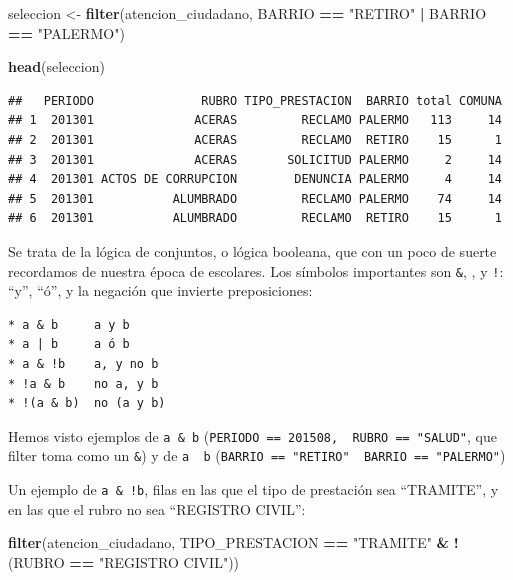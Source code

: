 \documentclass[]{book}
\newenvironment{Shaded}{\begin{snugshade}}{\end{snugshade}}
\newcommand{\KeywordTok}[1]{\textcolor[rgb]{0.13,0.29,0.53}{\textbf{#1}}}
\newcommand{\StringTok}[1]{\textcolor[rgb]{0.31,0.60,0.02}{#1}}
\newcommand{\OperatorTok}[1]{\textcolor[rgb]{0.81,0.36,0.00}{\textbf{#1}}}
\newcommand{\NormalTok}[1]{#1}
\begin{document}
\begin{Shaded}
\begin{Highlighting}[]
\NormalTok{seleccion <-}\StringTok{ }\KeywordTok{filter}\NormalTok{(atencion_ciudadano, BARRIO }\OperatorTok{==}\StringTok{ "RETIRO"} \OperatorTok{|}\StringTok{ }\NormalTok{BARRIO }\OperatorTok{==}\StringTok{ "PALERMO"}\NormalTok{)}

\KeywordTok{head}\NormalTok{(seleccion)}
\end{Highlighting}
\end{Shaded}

\begin{verbatim}
##   PERIODO               RUBRO TIPO_PRESTACION  BARRIO total COMUNA
## 1  201301              ACERAS         RECLAMO PALERMO   113     14
## 2  201301              ACERAS         RECLAMO  RETIRO    15      1
## 3  201301              ACERAS       SOLICITUD PALERMO     2     14
## 4  201301 ACTOS DE CORRUPCION        DENUNCIA PALERMO     4     14
## 5  201301           ALUMBRADO         RECLAMO PALERMO    74     14
## 6  201301           ALUMBRADO         RECLAMO  RETIRO    15      1
\end{verbatim}

Se trata de la lógica de conjuntos, o lógica booleana, que con un poco
de suerte recordamos de nuestra época de escolares. Los símbolos
importantes son \texttt{\&}, \texttt{\textbar{}}, y \texttt{!}: ``y'',
``ó'', y la negación que invierte preposiciones:

\begin{verbatim}
* a & b     a y b
* a | b     a ó b
* a & !b    a, y no b
* !a & b    no a, y b
* !(a & b)  no (a y b) 
\end{verbatim}

Hemos visto ejemplos de \texttt{a\ \&\ b}
(\texttt{PERIODO\ ==\ 201508,\ \ RUBRO\ ==\ "SALUD"}, que filter toma
como un \texttt{\&}) y de \texttt{a\ \textbar{}\ b}
(\texttt{BARRIO\ ==\ "RETIRO"\ \textbar{}\ BARRIO\ ==\ "PALERMO"})

Un ejemplo de \texttt{a\ \&\ !b}, filas en las que el tipo de prestación
sea ``TRAMITE'', y en las que el rubro no sea ``REGISTRO CIVIL'':

\begin{Shaded}
\begin{Highlighting}[]
\KeywordTok{filter}\NormalTok{(atencion_ciudadano, TIPO_PRESTACION }\OperatorTok{==}\StringTok{ "TRAMITE"} \OperatorTok{&}\StringTok{ }\OperatorTok{!}\NormalTok{(RUBRO }\OperatorTok{==}\StringTok{ "REGISTRO CIVIL"}\NormalTok{))}
\end{Highlighting}
\end{Shaded}
\end{document}

